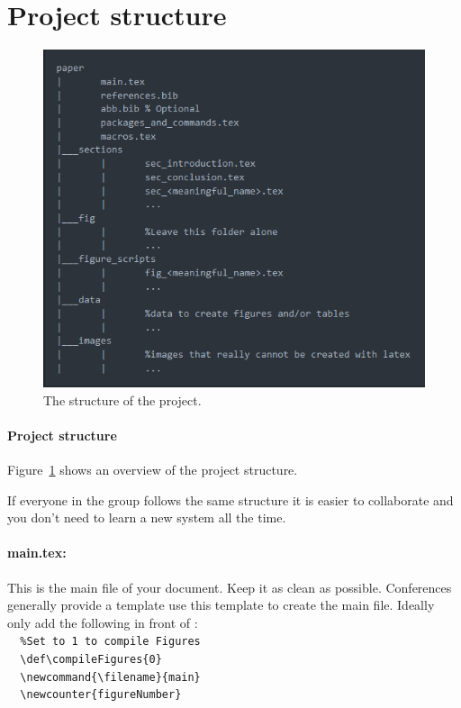 \section{Project structure}\label{sec:projectStructure}

\begin{figure}
	\centering
	\includegraphics[width=\textwidth]{images/project_structure.png}
	\caption{The structure of the project.}
	\label{fig:projectStructure}
\end{figure}

\paragraph{Project structure}
Figure~\ref{fig:projectStructure} shows an overview of the project structure.

\why If everyone in the group follows the same structure it is easier to collaborate and you don't need to learn a new system all the time.

\paragraph{main.tex:} This is the main file of your document. Keep it as clean as possible. Conferences generally provide a template use this template to create the main file. Ideally only add the following in front of \verb||:	
\verb|	|\\
\verb|	%Set to 1 to compile Figures|\\
\verb|	\def\compileFigures{0}|\\
\verb|	\newcommand{\filename}{main}|\\
\verb|	\newcounter{figureNumber}|\\
\verb|	|\\
\verb|	|\\
\verb|	|\\

